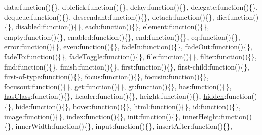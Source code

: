 \begin{DoxyCompactItemize}
\textquotesingle{}data\textquotesingle{}\+:function()\{\}, \textquotesingle{}dblclick\textquotesingle{}\+:function()\{\}, \textquotesingle{}delay\textquotesingle{}\+:function()\{\}, \textquotesingle{}delegate\textquotesingle{}\+:function()\{\}, \textquotesingle{}dequeue\textquotesingle{}\+:function()\{\}, \textquotesingle{}descendant\textquotesingle{}\+:function()\{\}, \textquotesingle{}detach\textquotesingle{}\+:function()\{\}, \textquotesingle{}die\textquotesingle{}\+:function()\{\}, \textquotesingle{}disabled\textquotesingle{}\+:function()\{\}, \textquotesingle{}\hyperlink{_scripts_2jquery-1_810_82_8min_8js_af24c9ea1e34372f8c8b312b35586008d}{each}\textquotesingle{}\+:function()\{\}, \textquotesingle{}element\textquotesingle{}\+:function()\{\}, \textquotesingle{}empty\textquotesingle{}\+:function()\{\}, \textquotesingle{}enabled\textquotesingle{}\+:function()\{\}, \textquotesingle{}end\textquotesingle{}\+:function()\{\}, \textquotesingle{}eq\textquotesingle{}\+:function()\{\}, \textquotesingle{}error\textquotesingle{}\+:function()\{\}, \textquotesingle{}even\textquotesingle{}\+:function()\{\}, \textquotesingle{}fade\+In\textquotesingle{}\+:function()\{\}, \textquotesingle{}fade\+Out\textquotesingle{}\+:function()\{\}, \textquotesingle{}fade\+To\textquotesingle{}\+:function()\{\}, \textquotesingle{}fade\+Toggle\textquotesingle{}\+:function()\{\}, \textquotesingle{}file\textquotesingle{}\+:function()\{\}, \textquotesingle{}filter\textquotesingle{}\+:function()\{\}, \textquotesingle{}find\textquotesingle{}\+:function()\{\}, \textquotesingle{}finish\textquotesingle{}\+:function()\{\}, \textquotesingle{}first\textquotesingle{}\+:function()\{\}, \textquotesingle{}first-\/child\textquotesingle{}\+:function()\{\}, \textquotesingle{}first-\/of-\/type\textquotesingle{}\+:function()\{\}, \textquotesingle{}focus\textquotesingle{}\+:function()\{\}, \textquotesingle{}focusin\textquotesingle{}\+:function()\{\}, \textquotesingle{}focusout\textquotesingle{}\+:function()\{\}, \textquotesingle{}get\textquotesingle{}\+:function()\{\}, \textquotesingle{}gt\textquotesingle{}\+:function()\{\}, \textquotesingle{}has\textquotesingle{}\+:function()\{\}, \textquotesingle{}\hyperlink{_scripts_2bootstrap_8min_8js_a8def0d8d5e720a12b6d5be36ad348855}{has\+Class}\textquotesingle{}\+:function()\{\}, \textquotesingle{}header\textquotesingle{}\+:function()\{\}, \textquotesingle{}height\textquotesingle{}\+:function()\{\}, \textquotesingle{}\hyperlink{_scripts_2jquery-1_810_82_8min_8js_a086b6295ec8d15f090cd7239137a4979}{hidden}\textquotesingle{}\+:function()\{\}, \textquotesingle{}hide\textquotesingle{}\+:function()\{\}, \textquotesingle{}hover\textquotesingle{}\+:function()\{\}, \textquotesingle{}html\textquotesingle{}\+:function()\{\}, \textquotesingle{}id\textquotesingle{}\+:function()\{\}, \textquotesingle{}image\textquotesingle{}\+:function()\{\}, \textquotesingle{}index\textquotesingle{}\+:function()\{\}, \textquotesingle{}init\textquotesingle{}\+:function()\{\}, \textquotesingle{}inner\+Height\textquotesingle{}\+:function()\{\}, \textquotesingle{}inner\+Width\textquotesingle{}\+:function()\{\}, \textquotesingle{}input\textquotesingle{}\+:function()\{\}, \textquotesingle{}insert\+After\textquotesingle{}\+:function()\{\}, 
\end{DoxyCompactItemize}
